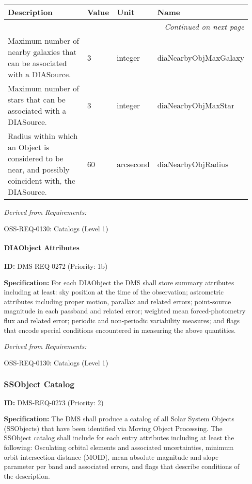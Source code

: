 \documentclass[SE,toc,lsstdraft]{lsstdoc}
\makeatletter
\newcommand{\paramname}[1]{\hspace{0pt}#1}
\newcommand{\unitname}[1]{\hspace{0pt}#1}
\newenvironment{parameters}[0]{%
\setlength\LTleft{0pt}
\setlength\LTright{\fill}
\begin{small}
\begin{longtable}[]{|p{0.49\textwidth}|l|p{0.6in}|p{1.70in}@{}|}

\hline \textbf{Description} & \textbf{Value} & \textbf{Unit} & \textbf{Name} \\ \hline
\endhead

\hline \multicolumn{4}{r}{\emph{Continued on next page}} \\
\endfoot

\hline\hline
\endlastfoot
}{%
\hline
\end{longtable}
\end{small}
}
\makeatother
\begin{document}
\begin{parameters}
Maximum number of nearby galaxies that can be associated with a DIASource.
&
3
&
\unitname{%
integer
}
&
\paramname{%
diaNearbyObjMaxGalaxy
} \\\hline
Maximum number of stars that can be associated with a DIASource.
&
3
&
\unitname{%
integer
}
&
\paramname{%
diaNearbyObjMaxStar
} \\\hline
Radius within which an Object is considered to be near, and possibly coincident with, the DIASource.
&
60
&
\unitname{%
arcsecond
}
&
\paramname{%
diaNearbyObjRadius
} \\\hline
\end{parameters}

\emph{Derived from Requirements:}

OSS-REQ-0130:
Catalogs (Level 1) \newline

\paragraph{DIAObject Attributes}\hfill  %

\label{DMS-REQ-0272}
\textbf{ID:} DMS-REQ-0272 (Priority: 1b)

\textbf{Specification:} For each DIAObject the DMS shall store summary attributes including at least: sky position at the time of the observation; astrometric attributes including proper motion, parallax and related errors; point-source magnitude in each passband and related error; weighted mean forced-photometry flux and related error; periodic and non-periodic variability measures; and flags that encode special conditions encountered in measuring the above quantities.

\emph{Derived from Requirements:}

OSS-REQ-0130:
Catalogs (Level 1) \newline

\subsubsection{SSObject Catalog}

\label{DMS-REQ-0273}
\textbf{ID:} DMS-REQ-0273 (Priority: 2)

\textbf{Specification:} The DMS shall produce a catalog of all Solar System Objects (SSObjects) that have been identified via Moving Object Processing. The SSObject catalog shall include for each entry attributes including at least the following: Osculating orbital elements and associated uncertainties, minimum orbit intersection distance (MOID), mean absolute magnitude and slope parameter per band and associated errors, and flags that describe conditions of the description.
\end{document}
